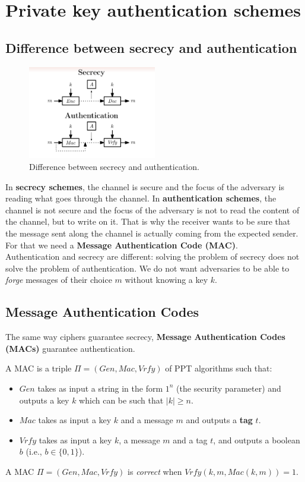 \documentclass[../main]{subfiles}
\begin{document}
\chapter{Private key authentication schemes}

\section{Difference between secrecy and authentication}

\begin{figure}[h]
    \centering
    \includegraphics[width=0.5\textwidth]{images/difference_secrecy_authentication}
    \caption{Difference between secrecy and authentication.}
\end{figure}
\noindent
In \textbf{secrecy schemes}, the channel is secure and the focus of the adversary is reading what goes through the channel. 
In \textbf{authentication schemes}, the channel is not secure and the focus of the adversary is not to read the content of the channel, but to write on it.
That is why the receiver wants to be sure that the message sent along the channel is actually coming from the expected sender.
For that we need a \textbf{Message Authentication Code (MAC)}.\\
\noindent
Authentication and secrecy are different: solving the problem of secrecy does not solve the problem of authentication.
We do not want adversaries to be able to \textit{forge} messages of their choice $m$ without knowing a key $k$.

\section{Message Authentication Codes}
The same way ciphers guarantee secrecy, \textbf{Message Authentication Codes (MACs)} guarantee authentication.
\begin{definition}
    A MAC is a triple $\Pi = (Gen, Mac, Vrfy)$ of PPT algorithms such that:
    \begin{itemize}
        \item $Gen$ takes as input a string in the form $1^n$ (the security parameter) and outputs a key $k$ which can be such that $|k|\ge n$.
        \item $Mac$ takes as input a key $k$ and a message $m$ and outputs a \textbf{tag} $t$.
        \item $Vrfy$ takes as input a key $k$, a message $m$ and a tag $t$, and outputs a boolean $b$ (i.e., $b \in{} \{0,1\}$).
    \end{itemize}
    A MAC $\Pi = (Gen, Mac, Vrfy)$ is \textit{correct} when $Vrfy(k, m, Mac(k, m)) = 1$.
\end{definition}
\end{document}
